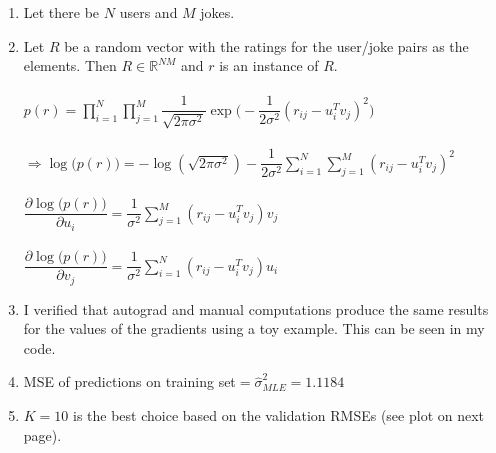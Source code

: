 \documentclass[10pt]{harvardml}
\newcommand{\R}{\mathbb{R}}
\theoremstyle{plain}
\begin{document}
\newpage
\begin{enumerate}[label=\alph*.]
\item Let there be $N$ users and $M$ jokes.
\begin{center}
\end{center}
\item Let $R$ be a random vector with the ratings for the user/joke pairs as the elements. Then $R\in\R^{NM}$ and $r$ is an instance of $R$.\\\\
$p(r)=\displaystyle\prod_{i=1}^{N}\displaystyle\prod_{j=1}^{M}\dfrac{1}{\sqrt{2\pi\sigma^2}}\exp\bigg(-\dfrac{1}{2\sigma^2}(r_{ij}-u_i^Tv_j)^2\bigg)$\\\\
$\Rightarrow\log\big(p(r)\big)=-\log(\sqrt{2\pi\sigma^2})-\dfrac{1}{2\sigma^2}\displaystyle\sum_{i=1}^{N}\displaystyle\sum_{j=1}^{M}(r_{ij}-u_i^Tv_j)^2$\\\\
$\dfrac{\partial\log\big(p(r)\big)}{\partial u_i}=\dfrac{1}{\sigma^2}\displaystyle\sum_{j=1}^{M}(r_{ij}-u_i^Tv_j)v_j$\\\\
$\dfrac{\partial\log\big(p(r)\big)}{\partial v_j}=\dfrac{1}{\sigma^2}\displaystyle\sum_{i=1}^{N}(r_{ij}-u_i^Tv_j)u_i$
\item I verified that autograd and manual computations produce the same results for the values of the gradients using a toy example. This can be seen in my code.
\item MSE of predictions on training set$=\hat\sigma_{MLE}^2=1.1184$
\item $K=10$ is the best choice based on the validation RMSEs (see plot on next page).

\newpage


\end{enumerate}
\end{document}
